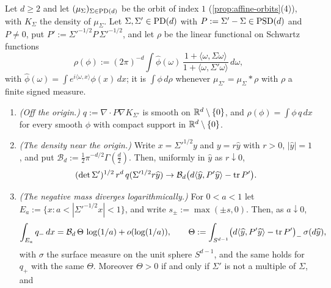 \begin{proposition}
\label{prop:matern-negative-mass}
\leanok
Let $d \ge 2$ and let $(\mu_\Sigma)_{\Sigma\in\mathrm{PD}(d)}$ be the \Matern{} orbit of index $1$
(\ref{prop:affine-orbits}(4)), with $K_\Sigma$ the density of $\mu_\Sigma$. Let
$\Sigma, \Sigma' \in \mathrm{PD}(d)$ with $P := \Sigma' - \Sigma \in \mathrm{PSD}(d)$ and $P \ne 0$, put
$P' := \Sigma'^{-1/2}P\,\Sigma'^{-1/2}$, and let $\rho$ be the linear functional on Schwartz
functions
\[
  \rho(\phi) := (2\pi)^{-d}\int\widehat\phi(\omega)\,
   \frac{1 + \langle\omega,\Sigma\omega\rangle}{1 + \langle\omega,\Sigma'\omega\rangle}\,d\omega ,
\]
with $\widehat\phi(\omega) = \int e^{i\langle\omega,x\rangle}\phi(x)\,dx$; it is $\int\phi\,d\rho$
whenever $\mu_{\Sigma'} = \mu_\Sigma * \rho$ with $\rho$ a finite signed measure.
\begin{enumerate}
\item \emph{(Off the origin.)} $q := \nabla\cdot P\nabla K_{\Sigma'}$ is smooth on
$\mathbb{R}^d \setminus \{0\}$, and $\rho(\phi) = \int\phi\,q\,dx$ for every smooth $\phi$ with compact
support in $\mathbb{R}^d \setminus \{0\}$.
\item \emph{(The density near the origin.)} Write $x = \Sigma'^{1/2}y$ and $y = r\widehat y$ with
$r > 0$, $|\widehat y| = 1$, and put $\mathcal{B}_d := \tfrac12\pi^{-d/2}\Gamma(\tfrac d2)$. Then,
uniformly in $\widehat y$ as $r \downarrow 0$,
\[
  (\det\Sigma')^{1/2}\,r^d\,q(\Sigma'^{1/2}r\widehat y) \to
  \mathcal{B}_d\bigl(d\langle\widehat y,P'\widehat y\rangle - \operatorname{tr} P'\bigr) .
\]
\item \emph{(The negative mass diverges logarithmically.)} For $0 < a < 1$ let
$E_a := \{x : a < |\Sigma'^{-1/2}x| < 1\}$, and write $s_\pm := \max(\pm s, 0)$. Then, as
$a \downarrow 0$,
\[
  \int_{E_a}q_-\,dx = \mathcal{B}_d\,\Theta\,\log(1/a) + o(\log(1/a)) , \qquad
  \Theta := \int_{S^{d-1}}\bigl(d\langle\widehat y,P'\widehat y\rangle - \operatorname{tr} P'\bigr)_-\,\sigma(d\widehat y) ,
\]
with $\sigma$ the surface measure on the unit sphere $S^{d-1}$, and the same holds for $q_+$ with
the same $\Theta$. Moreover $\Theta > 0$ if and only if $\Sigma'$ is not a multiple of $\Sigma$, and

\end{enumerate}
\end{proposition}
